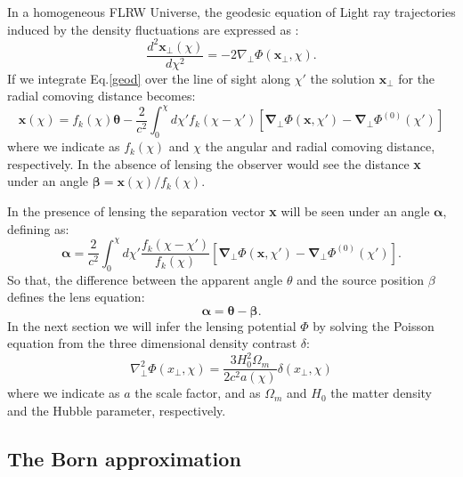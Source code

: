 \documentclass[twocolumn,twocolappendix]{aastex63}
\begin{document}
In a homogeneous FLRW Universe, the geodesic equation of Light ray trajectories induced by the density fluctuations are expressed as :
\begin{equation}\label{geod}
    \frac{d^2\textbf{x}_{\bot}(\chi)}{d\chi^2}
    = -2 \nabla_{\bot} \Phi(\textbf{x}_{\bot},\chi).
\end{equation}
If we integrate Eq.\ref{geod} over the line of sight along $\chi'$ the solution $\textbf{x}_{\bot}$ for the radial comoving distance becomes:
\begin{equation}
    \textbf{x}(\chi)=f_k(\chi)\boldsymbol{\theta}-\frac{2}{c^2} 
    \int_0^{\chi} d\chi'f_k(\chi-\chi')[\boldsymbol{\nabla}_{\bot}\Phi(\textbf{x},\chi')-\boldsymbol{\nabla}_{\bot}\Phi^{(0)}(\chi')]
\end{equation}
 where we indicate as $f_k(\chi)$ and $\chi$ the angular and radial comoving distance, respectively.
 In the absence of lensing the observer would see the distance \textbf{x} under an angle $\boldsymbol{\beta}$$=\textbf{x}(\chi)/f_k(\chi)$.
 
 In the presence of lensing the separation vector \textbf{x} will be seen under an angle $\boldsymbol{\alpha}$, defining as:
 \begin{equation}
     \boldsymbol{\alpha}=\frac{2}{c^2} \int_0^{\chi} d\chi'
     \frac{f_k(\chi-\chi')}{f_k(\chi)}
     [\boldsymbol{\nabla}_{\bot}\Phi(\textbf{x},\chi')-\boldsymbol{\nabla}_{\bot}\Phi^{(0)}(\chi')].
 \end{equation}
 So that, the difference between the apparent angle $\theta$ and the source position $\beta$ defines the lens equation:
 \begin{equation}
 \boldsymbol{\alpha=\theta - \beta}.
 \end{equation}
In the next section we will infer the lensing potential  $\Phi$ by solving the Poisson equation from the three dimensional density contrast $\delta$:
\begin{equation}\label{Poisson}
    \nabla_{\bot}^2 \Phi(x_{\bot},\chi)=
    \frac{3H_0^2 \Omega_m}{2c^2a(\chi)}
    \delta(x_{\bot},\chi)
\end{equation}
where we indicate as $a$ the scale factor, and  as $\Omega_m$ and $H_0$ the matter density and the Hubble parameter, respectively. 

\subsection{The Born approximation}
\end{document}

